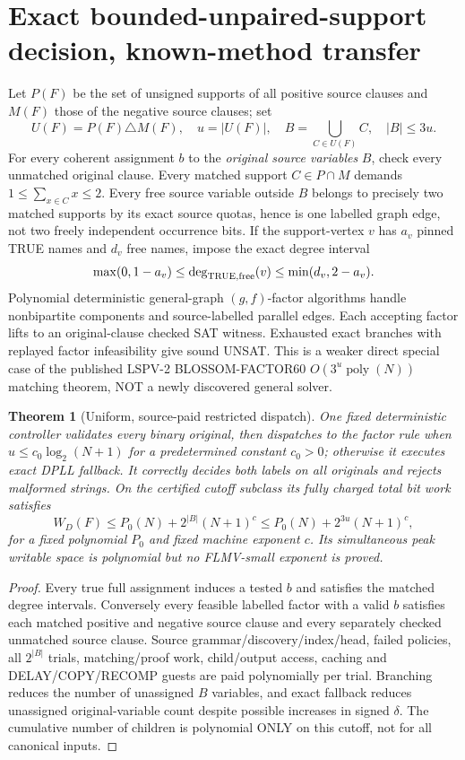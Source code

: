 \documentclass[11pt]{article}
\newtheorem{theorem}{Theorem}
\begin{document}
\section{Exact bounded-unpaired-support decision, known-method transfer}
Let $P(F)$ be the set of unsigned supports of all positive source clauses and $M(F)$ those of the negative source clauses; set
\[
U(F)=P(F)\triangle M(F),\quad u=|U(F)|,\quad B=\bigcup_{C\in U(F)} C,\quad |B|\le3u.
\]
For every coherent assignment $b$ to the \emph{original source variables} $B$, check every unmatched original clause. Every matched support $C\in P\cap M$ demands $1\le\sum_{x\in C}x\le2$. Every free source variable outside $B$ belongs to precisely two matched supports by its exact source quotas, hence is one labelled graph edge, not two freely independent occurrence bits. If the support-vertex $v$ has $a_v$ pinned TRUE names and $d_v$ free names, impose the exact degree interval
\[
\max(0,1-a_v)\le\deg_{\rm TRUE,free}(v)\le\min(d_v,2-a_v).
\]
Polynomial deterministic general-graph $(g,f)$-factor algorithms handle nonbipartite components and source-labelled parallel edges. Each accepting factor lifts to an original-clause checked SAT witness. Exhausted exact branches with replayed factor infeasibility give sound UNSAT. This is a weaker direct special case of the published LSPV-2 BLOSSOM-FACTOR60 $O(3^u\operatorname{poly}(N))$ matching theorem, NOT a newly discovered general solver.
\begin{theorem}[Uniform, source-paid restricted dispatch]
One fixed deterministic controller validates every binary original, then dispatches to the factor rule when $u\le c_0\log_2(N+1)$ for a predetermined constant $c_0>0$; otherwise it executes exact DPLL fallback. It correctly decides both labels on all originals and rejects malformed strings. On the certified cutoff subclass its fully charged total bit work satisfies
\[
W_D(F)\le P_0(N)+2^{|B|}(N+1)^c\le P_0(N)+2^{3u}(N+1)^c,
\]
for a fixed polynomial $P_0$ and fixed machine exponent $c$. Its simultaneous peak writable space is polynomial but no FLMV-small exponent is proved.
\end{theorem}
\begin{proof}
Every true full assignment induces a tested $b$ and satisfies the matched degree intervals. Conversely every feasible labelled factor with a valid $b$ satisfies each matched positive and negative source clause and every separately checked unmatched source clause. Source grammar/discovery/index/head, failed policies, all $2^{|B|}$ trials, matching/proof work, child/output access, caching and DELAY/COPY/RECOMP guests are paid polynomially per trial. Branching reduces the number of unassigned $B$ variables, and exact fallback reduces unassigned original-variable count despite possible increases in signed $\delta$. The cumulative number of children is polynomial ONLY on this cutoff, not for all canonical inputs.
\end{proof}
\end{document}
